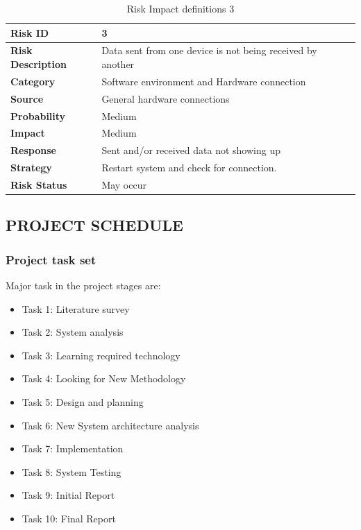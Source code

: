 \documentclass[12pt,a4paper]
{article}
\numberwithin{table}{section}
\begin{document}
{{{{{%


\begin{table}[htbp]
\begin{center}
\begin{tabular}{|l|p{300pt}|}
\hline
\textbf{Risk ID}& 
3 \\
\hline
\textbf{Risk Description}& 
Data sent from one device is not being received by another \\
\hline
\textbf{Category}& 
Software environment and Hardware connection  \\
\hline
\textbf{Source}& 
General hardware connections \\
\hline
\textbf{Probability}& 
Medium \\
\hline
\textbf{Impact}& 
Medium \\
\hline
\textbf{Response}& 
Sent and/or received data not showing up\\
\hline
\textbf{Strategy}& 
Restart system and check for connection.\\
\hline
\textbf{Risk Status}& 
May occur \\
\hline
\end{tabular}
\caption{Risk Impact definitions 3 }
\label{tab1}
\end{center}
\end{table}

\newpage
 
\subsection{PROJECT SCHEDULE}
\subsubsection{Project task set}
Major task in the project stages are:
\begin{itemize}



\item	Task 1:	Literature survey
\item	Task 2: System analysis
\item	Task 3: Learning required technology
\item	Task 4: Looking for New Methodology 
\item	Task 5: Design and planning
\item	Task 6: New System architecture analysis
\item	Task 7: Implementation
\item	Task 8: System Testing
\item	Task 9: Initial Report
\item	Task 10: Final Report
	\end{itemize}


}}}}}
\end{document}
